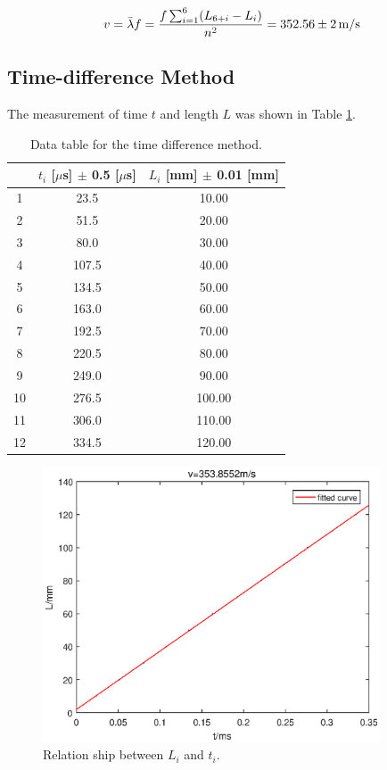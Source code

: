 \documentclass{article}
\begin{document}
$$v=\bar{\lambda}f=\frac{f\sum_{i=1}^{6}(L_{6+i}-L_i)}{n^2}=352.56\pm 2\,\rm{m/s}$$

\newpage

\subsection{Time-difference Method}

The measurement of time $t$ and length $L$ was shown in Table \ref{tab-3}.

\begin{table}[!h]
\begin{center}
\begin{tabular}{|c|c|c|}
\hline
& $t_i$ [$\mu$s] $\pm$ 0.5 [$\mu$s] & $L_i$ [mm] $\pm$ 0.01 [mm] \\
\hline
1 & 23.5 & 10.00 \\
2 & 51.5 & 20.00 \\
3 & 80.0 & 30.00 \\
4 & 107.5& 40.00 \\
5 & 134.5& 50.00 \\
6 & 163.0& 60.00 \\
7 & 192.5& 70.00 \\
8 & 220.5& 80.00 \\
9 & 249.0& 90.00 \\
10& 276.5& 100.00 \\
11& 306.0& 110.00 \\
12& 334.5& 120.00 \\
\hline
\end{tabular}
\caption{Data table for the time difference method.}
\label{tab-3}
\end{center}
\end{table}

\begin{figure}[!h]
	\centering
	\includegraphics[width=10cm]{fig-3.eps}
	\caption{Relation ship between $L_i$ and $t_i$.
	\label{fig-3}}
\end{figure}
\end{document}
